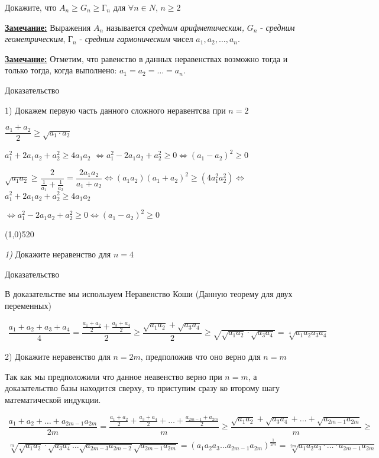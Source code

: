 \documentclass[12pt]{article}
\begin{document}
	\medskip Докажите, что $A_n \ge G_n \ge \text{Г}_n$ для $\forall n\in N$, $n\ge 2$\medskip
	
	\underline{\bf Замечание:} Выражения $A_n$ называется {\it средним арифметическим,} $G_n$ - {\it средним геометрическим}, $\text{Г}_n$ - {\it средним гармоническим} чисел $a_1,a_2,\dots,a_n$.
	
	\underline{\bf Замечание:} Отметим, что равенство в данных неравенствах возможно тогда и только тогда, когда выполнено: $a_1=a_2=\dots=a_n$. 
	
	\vspace{2mm} Доказательство
	
	1) Докажем первую часть данного сложного неравентсва при $n=2$\medskip
	
	\quad$
	\dfrac{a_1+a_2}{2} \ge \sqrt{a_1\cdot a_2}
	$
	\vspace{2mm}
	
	$a_1^2+2a_1a_2+a_2^2 \ge 4a_1a_2$ \quad$\Longleftrightarrow$\quad $a_1^2-2a_1a_2+a_2^2\ge0$\quad$\Longleftrightarrow$\quad $(a_1-a_2)^2\ge0$\medskip
	
	$\sqrt{a_1a_2}\ge \dfrac{2}{\frac{1}{a_1}+\frac{1}{a_2}} = \dfrac{2a_1a_2}{a_1+a_2}$\quad$\Longleftrightarrow$\quad $(a_1a_2)(a_1+a_2)^2 \ge (4a_1^2a_2^2)$\quad$\Longleftrightarrow$\quad $a_1^2+2a_1a_2+a_2^2 \ge 4a_1a_2$\vspace{1mm}
	
	$\Longleftrightarrow$\quad$a_1^2-2a_1a_2+a_2^2\ge 0$\quad$\Longleftrightarrow$\quad $(a_1-a_2)^2 \ge 0$
	
	\line(1,0){520}
	
	{\it 1)} Докажите неравенство для $n=4$\medskip
	
	Доказательство
	\medskip
	
	В доказательстве мы используем Неравенство Коши (Данную теорему для двух переменных)
	
	\begin{eqnarray*}
		\dfrac{a_1+a_2+a_3+a_4}{4} = \dfrac{\frac{a_1+a_2}{2}+\frac{a_3+a_4}{2}}{2} \ge \dfrac{\sqrt{a_1a_2}+\sqrt{a_3a_4}}{2} \ge \sqrt{\sqrt{a_1a_2}\cdot\sqrt{a_3a_4}} = \sqrt[4]{a_1a_2a_3a_4}
	\end{eqnarray*}
	
	2) Докажите неравенство для $n=2m$, предположив что оно верно для $n=m$
	
	Так как мы предположили что данное неавенство верно при $n=m$, а доказательство базы находится сверху, то приступим сразу ко второму шагу математической индукции.
	
	\begin{eqnarray*}
		\dfrac{a_1+a_2+\dots+a_{2m-1}a_{2m}}{2m} = \dfrac{\frac{a_1+a_2}{2}+\frac{a_3+a_4}{2}+\dots+\frac{a_{2m-1}+a_{2m}}{2}}{m}\ge \dfrac{\sqrt{a_1a_2}+\sqrt{a_3a_4}+\dots+\sqrt{a_{2m-1}a_{2m}}}{m} \ge\\
		\sqrt[m]{\sqrt{a_1a_2}\cdot\sqrt{a_3a_4}\dots \sqrt{a_{2m-3}a_{2m-2}} \sqrt{a_{2m-1}a_{2m}}} = (a_1a_2a_3\dots a_{2m-1}a_{2m})^{\frac{1}{2m}} = \sqrt[2m]{a_1a_2a_3\cdot\dots\cdot a_{2m-1}a_{2m}}
	\end{eqnarray*}
	
\end{document}
